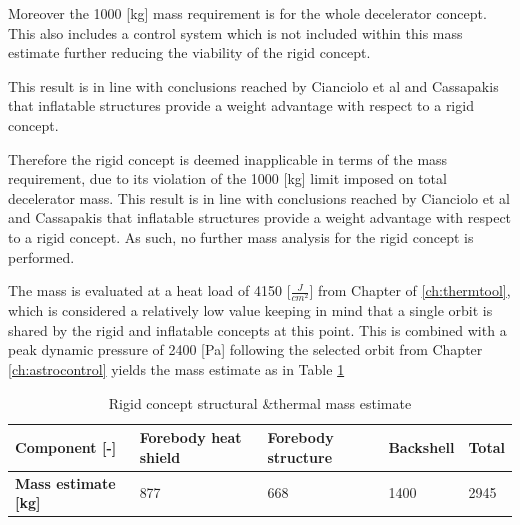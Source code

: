 Moreover the 1000 [kg] mass requirement is for the whole decelerator concept. This also includes a control system which is not included within this mass estimate further reducing the viability of the rigid concept. 

This result is in line with conclusions reached by Cianciolo et al \cite{Cianciolo2010} and Cassapakis \cite{Cassapakis1995} that inflatable structures provide a weight advantage with respect to a rigid concept.

Therefore the rigid concept is deemed inapplicable in terms of the mass requirement, due to its violation of the 1000 [kg] limit imposed on total decelerator mass. This result is in line with conclusions reached by Cianciolo et al \cite{Cianciolo2010} and Cassapakis \cite{Cassapakis1995} that inflatable structures provide a weight advantage with respect to a rigid concept. As such, no further mass analysis for the rigid concept is performed.

The mass is evaluated at a heat load of 4150 [$\frac{J}{cm^2}$] from Chapter of \ref{ch:thermtool}, which is considered a relatively low value keeping in mind that a single orbit is shared by the rigid and inflatable concepts at this point. This is combined with a peak dynamic pressure of 2400 [Pa] following the selected orbit from Chapter \ref{ch:astrocontrol} yields the mass estimate as in Table \ref{tab:strucmassrigid}

\begin{table}[h]
\centering
\caption{Rigid concept structural \&thermal mass estimate}
\begin{tabular}{|l|l|l|l|l|}
\hline
\textbf{Component {[}-{]}}                                                                                & Forebody heat shield & Forebody structure & Backshell & Total \\ \hline
\textbf{Mass estimate {[}kg{]}}                                                                          & 877           & 668          & 1400             & 2945        \\ \hline
\end{tabular}
\label{tab:strucmassrigid}
\end{table}

 


